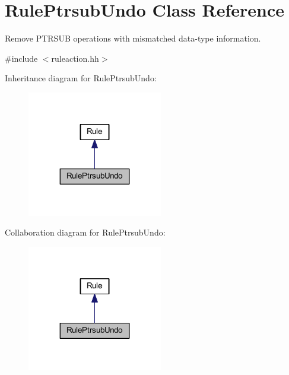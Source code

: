 \hypertarget{class_rule_ptrsub_undo}{}\section{Rule\+Ptrsub\+Undo Class Reference}
\label{class_rule_ptrsub_undo}


Remove P\+T\+R\+S\+UB operations with mismatched data-\/type information.  




{\ttfamily \#include $<$ruleaction.\+hh$>$}



Inheritance diagram for Rule\+Ptrsub\+Undo\+:
\nopagebreak
\begin{figure}[H]
\begin{center}
\leavevmode
\includegraphics[width=167pt]{class_rule_ptrsub_undo__inherit__graph}
\end{center}
\end{figure}


Collaboration diagram for Rule\+Ptrsub\+Undo\+:
\nopagebreak
\begin{figure}[H]
\begin{center}
\leavevmode
\includegraphics[width=167pt]{class_rule_ptrsub_undo__coll__graph}
\end{center}
\end{figure}
